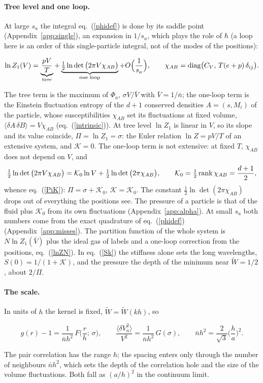 \documentclass[11pt,aps,preprint,nofootinbib,superscriptaddress,tightenlines]{revtex4-2}
\newcommand{\avg}[1]{\langle #1\rangle}
\def\st{\begin{equation}}
\def\stp{\end{equation}}
\def\Eq#1{eq.~(\ref{#1})}
\def\App#1{Appendix~\ref{#1}}
\let\oldparagraph\paragraph
\renewcommand{\paragraph}{\par\bigskip\oldparagraph}
\begin{document}
\paragraph{Tree level and one loop.}  At large $s_a$ the integral \Eq{phidef} is done by its saddle point (\App{app:single}), an expansion in $1/s_a$,
which plays the role of $\hbar$ (a loop here is an order of this single-particle integral, not of the modes of the positions):
\begin{keyeq}
\st
\ln Z_1(V)=\underbrace{\frac{pV}{T}}_{\text{tree}}+\underbrace{\tfrac12\ln\det\big(2\pi V\chi_{AB}\big)}_{\text{one loop}}+O\Big(\frac1{s_a}\Big),
\qquad \chi_{AB}={\rm diag}\big(C_V,\,T(e+p)\,\delta_{ij}\big).
\label{philoop}
\stp
\end{keyeq}
The tree term is the maximum of $\Phi_a$, $\sigma V/\bar V$ with $\bar V=1/\bar n$; the one-loop term is the Einstein fluctuation entropy of the $d+1$
conserved densities $A=(s,M_i)$ of the particle, whose susceptibilities $\chi_{AB}$ set its fluctuations at fixed volume,
$\avg{\delta A\,\delta B}=V\chi_{AB}$ (\Eq{intrinsic}).  At tree level $\ln Z_1$ is linear in $V$, so its slope and its value coincide, $\Pi=\ln Z_1=\sigma$:
the Euler relation $\ln Z=pV/T$ of an extensive system, and $\mathcal K=0$.  The one-loop term is not extensive: at fixed $T$, $\chi_{AB}$ does not
depend on $V$, and
\st
\tfrac12\ln\det\big(2\pi V\chi_{AB}\big)=\mathcal K_0\ln V+\tfrac12\ln\det\big(2\pi\chi_{AB}\big),\qquad
\mathcal K_0=\tfrac12\,{\rm rank}\,\chi_{AB}=\frac{d+1}2 ,
\stp
whence \Eq{PiK}: $\Pi=\sigma+\mathcal K_0$, $\mathcal K=\mathcal K_0$.  The constant $\tfrac12\ln\det(2\pi\chi_{AB})$ drops out of everything the positions
see.  The pressure of a particle is that of the fluid plus $\mathcal K_0$ from its own fluctuations (\App{app:alpha}).  At small $s_a$ both numbers
come from the exact quadrature of \Eq{phidef} (\App{app:misses}).  The partition function of the whole system is $N\ln Z_1(\bar V)$ plus the ideal gas of labels and a one-loop correction
from the positions, \Eq{lnZN}.  In \Eq{Sk} the stiffness alone sets the long wavelengths, $S(0)=1/(1+\mathcal K)$,
and the pressure the depth of the minimum near $\widetilde W=1/2$, about $2/\Pi$.

\paragraph{The scale.}  In units of $h$ the kernel is fixed, $\widetilde W=\widetilde W(kh)$, so
\begin{keyeq}
\st
g(r)-1=\frac{1}{\bar nh^2}\,F\Big(\frac rh;\,\sigma\Big),\qquad
\frac{\avg{\delta V_a^2}}{V^2}=\frac{1}{\bar nh^2}\,G(\sigma),\qquad \bar nh^2=\frac2{\sqrt3}\Big(\frac ha\Big)^2 .
\label{scaling}
\stp
\end{keyeq}
The pair correlation has the range $h$; the spacing enters only through the number of neighbours $\bar nh^2$, which sets the depth of the
correlation hole and the size of the volume fluctuations.  Both fall as $(a/h)^2$ in the continuum limit.
\end{document}
